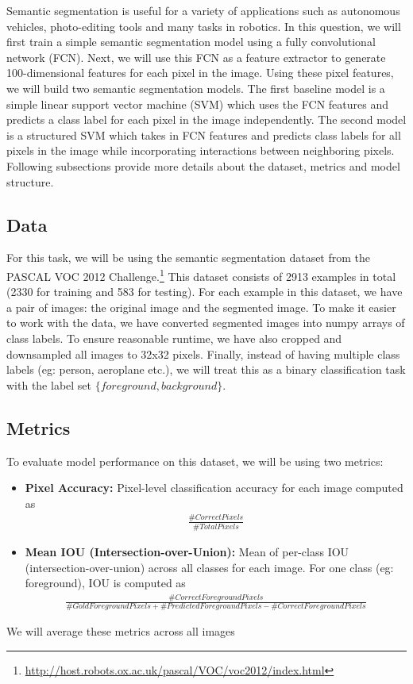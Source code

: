 \documentclass[11pt,addpoints,answers]{exam}
\numberwithin{equation}{section} %
\numberwithin{figure}{section} %
\numberwithin{table}{section} %
\begin{document}
Semantic segmentation is useful for a variety of applications such as autonomous vehicles, photo-editing tools and many tasks in robotics. In this question, we will first train a simple semantic segmentation model using a fully convolutional network (FCN). Next, we will use this FCN as a feature extractor to generate 100-dimensional features for each pixel in the image. Using these pixel features, we will build two semantic segmentation models. The first baseline model is a simple linear support vector machine (SVM) which uses the FCN features and predicts a class label for each pixel in the image independently. The second model is a structured SVM which takes in FCN features and predicts class labels for all pixels in the image while incorporating interactions between neighboring pixels. Following subsections provide more details about the dataset, metrics and model structure.

\subsection{Data}
For this task, we will be using the semantic segmentation dataset from the PASCAL VOC 2012 Challenge.\footnote{\url{http://host.robots.ox.ac.uk/pascal/VOC/voc2012/index.html}} This dataset consists of 2913 examples in total (2330 for training and 583 for testing). For each example in this dataset, we have a pair of images: the original image and the segmented image. To make it easier to work with the data, we have converted segmented images into numpy arrays of class labels. To ensure reasonable runtime, we have also cropped and downsampled all images to 32x32 pixels. Finally, instead of having multiple class labels (eg: person, aeroplane etc.), we will treat this as a binary classification task with the label set $\{foreground, background\}$.

\subsection{Metrics}
To evaluate model performance on this dataset, we will be using two metrics:
\begin{itemize}
    \item \textbf{Pixel Accuracy:} Pixel-level classification accuracy for each image computed as\\
    \begin{align}
    \frac{\#CorrectPixels}{\#TotalPixels}
    \end{align}
    \item \textbf{Mean IOU (Intersection-over-Union):} Mean of per-class IOU (intersection-over-union) across all classes for each image. For one class (eg: foreground), IOU is computed as \\
    \begin{align}
        \frac{\#CorrectForegroundPixels}{\#GoldForegroundPixels + \#PredictedForegroundPixels - \#CorrectForegroundPixels}
    \end{align}
\end{itemize}{}
We will average these metrics across all images
\end{document}

